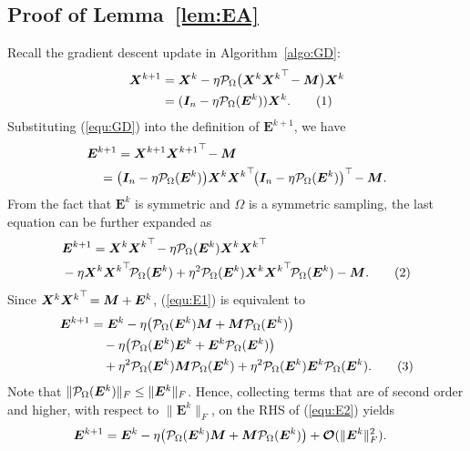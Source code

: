 \documentclass{article}
\def\P{{\cal P}}
\newcommand{\norm}[1]{\|#1\|} %
\newcommand\numberthis{\addtocounter{equation}{1}\tag{\theequation}}
\newcommand{\topnew}{\top \hspace{-0.05cm}}
\begin{document}
\subsection{Proof of Lemma~\ref{lem:EA}}
Recall the gradient descent update in Algorithm~\ref{algo:GD}:
\begin{align*} 
    \bm X^{k+1} &= \bm X^k - \eta \P_\Omega \bigl(\bm X^k {\bm X^k}^\topnew - \bm M\bigr) \bm X^k \\
    &= (\bm I_n  - \eta \P_\Omega (\bm E^k)) \bm X^k . \numberthis \label{equ:GD}
\end{align*}
Substituting (\ref{equ:GD}) into the definition of $\bm E^{k+1}$, we have
\begin{align*}
    &\bm E^{k+1} = \bm X^{k+1} {\bm X^{k+1}}^\topnew - \bm M \\
    &\quad = \bigl( \bm I_n  - \eta \P_\Omega (\bm E^k)  \bigr) \bm X^k {\bm X^k}^\topnew \bigl( \bm I_n  - \eta \P_\Omega (\bm E^k)  \bigr)^\topnew - \bm M.
\end{align*}
From the fact that $\bm E^k$ is symmetric and $\Omega$ is a symmetric sampling, the last equation can be further expanded as
\begin{align*}
    &\bm E^{k+1} = \bm X^k {\bm X^k}^\topnew - \eta \P_\Omega (\bm E^k) \bm X^k {\bm X^k}^\topnew \\
    &- \eta \bm X^k {\bm X^k}^\topnew \P_\Omega (\bm E^k) + \eta^2 \P_\Omega (\bm E^k) \bm X^k {\bm X^k}^\topnew \P_\Omega (\bm E^k) - \bm M . \numberthis \label{equ:E1}
\end{align*}
Since $\bm X^k {\bm X^k}^\topnew = \bm M + \bm E^k$, (\ref{equ:E1}) is equivalent to
\begin{align*}
    \bm E^{k+1} &= \bm E^k - \eta \bigl( \P_\Omega (\bm E^k) \bm M + \bm M \P_\Omega (\bm E^k) \bigr) \\
    &\quad - \eta \bigl( \P_\Omega (\bm E^k) \bm E^k + \bm E^k \P_\Omega (\bm E^k) \bigr) \\
    &\quad + \eta^2 \P_\Omega (\bm E^k) \bm M \P_\Omega (\bm E^k) + \eta^2 \P_\Omega (\bm E^k) \bm E^k \P_\Omega (\bm E^k) . \numberthis \label{equ:E2}
\end{align*}
Note that $\norm{\P_\Omega (\bm E^k)}_F \leq \norm{\bm E^k}_F$. Hence, collecting terms that are of second order and higher, with respect to $\norm{\bm E^k}_F$, on the RHS of (\ref{equ:E2}) yields
\begin{align*}
    \bm E^{k+1} &= \bm E^k - \eta \bigl( \P_\Omega (\bm E^k) \bm M + \bm M \P_\Omega (\bm E^k) \bigr) + \bm{\mathcal{O}}(\norm{\bm E^k}_F^2) .
\end{align*}
\end{document}
